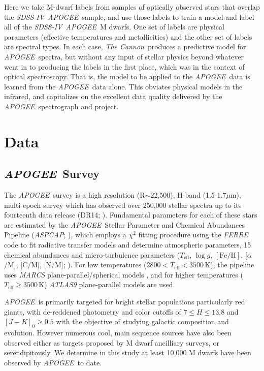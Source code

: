 \documentclass[modern]{aastex62}
\newcommand{\apogee}{\textsl{APOGEE}}
\newcommand{\thecannon}{\textsl{The Cannon}}
\newcommand{\aspcap}{\textsl{ASPCAP}}
\newcommand{\sdssiv}{\textsl{SDSS-IV}}
\newcommand{\teff}{T_{\mathrm{eff}}}
\newcommand{\logg}{\log g}
\newcommand{\feh}{[{\mathrm{Fe}/\mathrm{H}}]}
\begin{document}
Here we take M-dwarf labels from samples of optically observed stars that overlap the
\sdssiv\ \apogee\ sample, and use those labels to train a model and label all of the
\sdssiv\ \apogee\ M dwarfs.
One set of labels are physical parameters (effective temperatures and metallicities)
and the other set of labels are spectral types.
In each case, \thecannon\ produces a predictive model for \apogee\ spectra, but without
any input of stellar physics beyond whatever went in to producing the labels in the first
place, which was in the context of optical spectroscopy.
That is, the model to be applied to the \apogee\ data is learned from the \apogee\ data alone.
This obviates physical models in the infrared, and capitalizes on the excellent data quality
delivered by the \apogee\ spectrograph and project.

\section{Data} \label{sec:data}

\subsection{\apogee\ Survey}

The \apogee\ survey 
is a high resolution (R$\sim$22,500), H-band (1.5-1.7$\mu$m), multi-epoch survey which has observed over 250,000 stellar spectra up to its fourteenth data release (DR14; \citealt{Abolfathi:2017}). Fundamental parameters for each of these stars are estimated by the \apogee\ Stellar Parameter and Chemical Abundances Pipeline (\aspcap; \citealt{Perez:2016}), which employs a $\chi^2$ fitting procedure using the \textsl{FERRE} code to fit radiative transfer models and determine atmospheric parameters, 15 chemical abundances and micro-turbulence parameters ($\teff$, $\logg$, $\feh$, [$\alpha$/M], [C/M], [N/M]; \citealt{Meszaros:2012}). For low temperatures ($2800<\teff<3500$\,K), the pipeline uses \textsl{MARCS} plane-parallel/spherical models \citep{Gustafsson:2008}, and for higher temperatures ($\teff\geq3500$\,K) \textsl{ATLAS9} \citep{Castelli:2004} plane-parallel models are used.

\apogee\ is primarily targeted for bright stellar populations particularly red giants, with de-reddened photometry and color cutoffs of $7 \leq H \leq 13.8$ and $[J-K]_0 \geq 0.5$ \citep{Zasowski:2013} with the objective of studying galactic composition and evolution. However numerous cool, main sequence sources have also been observed either as targets proposed by M dwarf ancilliary surveys, or serendipitously. We determine in this study at least 10,000 M dwarfs have been observed by \apogee\ to date.
\end{document}
